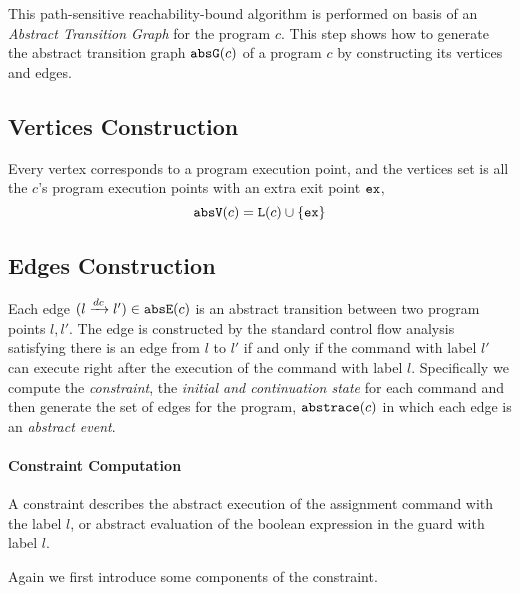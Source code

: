 This path-sensitive reachability-bound algorithm
is performed on basis of an \emph{Abstract Transition Graph} for the program $c$.
This step shows how to generate the abstract transition graph $\mathtt{abs}{\mathtt{G}}(c)$ of a
program $c$ by constructing its vertices and edges.

\subsection{Vertices Construction}
\label{sec:abs_prog-vertex}
Every 
vertex corresponds to a program execution point, 
and the vertices set is all the $c$'s program execution points with an extra exit point ${\mathtt{ex}}$, 
\[ 
 \mathtt{abs}{\mathtt{V}}(c) = \mathtt{L}(c)\cup\{{\mathtt{ex}}\}
 \]

\subsection{Edges Construction}
\label{sec:abs_prog-edge}
Each edge $(l \xrightarrow{dc} l') \in \mathtt{abs}{\mathtt{E}}(c)$ is an abstract transition
between two program points $l, l'$. 
The edge is constructed by the standard control flow analysis satisfying
there is an edge from $l$ to $l'$ if and only if
the command with label $l'$ can execute right after the execution of the command with label $l$.
Specifically we compute the \emph{constraint}, the \emph{initial and continuation state} for each command
and then generate the set of edges for the program, $\mathtt{abs}{\mathtt{trace}}(c)$ in which each edge is an
\emph{abstract event}.
\paragraph{Constraint Computation}
A constraint describes the abstract execution of the assignment command with the label $l$,
or abstract evaluation of the boolean expression in the guard with label $l$.

Again we first introduce some components of the constraint.

